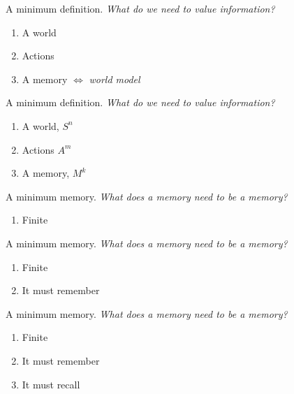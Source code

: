 \documentclass[10pt]{beamer}
\begin{document}
\begin{frame}[fragile]{A minimum definition.}
\textit{What do we need to value information?}
\begin{enumerate}
    \item A world
    \item Actions
    \item A memory $\Leftrightarrow$ \textit{world model}
\end{enumerate}
\end{frame}

\begin{frame}[fragile]{A minimum definition.}
\textit{What do we need to value information?}
\begin{enumerate}
    \item A world, $S^n$
    \item Actions $A^m$
    \item A memory, $M^k$
\end{enumerate}
\end{frame}

\begin{frame}[fragile]{A minimum memory.}
\textit{What does a memory need to be a memory?}
\begin{enumerate}
    \item Finite
\end{enumerate}
\end{frame}

\begin{frame}[fragile]{A minimum memory.}
\textit{What does a memory need to be a memory?}
\begin{enumerate}
    \item Finite
    \item It must remember
\end{enumerate}
\end{frame}

\begin{frame}[fragile]{A minimum memory.}
\textit{What does a memory need to be a memory?}
\begin{enumerate}
    \item Finite
    \item It must remember
    \item It must recall
\end{enumerate}
\end{frame}
\end{document}

